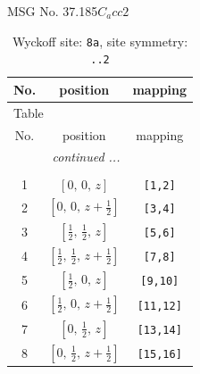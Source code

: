 \documentclass[fleqn,8pt]{jsarticle}
\begin{document}
\setcounter{MaxMatrixCols}{32}

\renewcommand{\tablename}{Table~}
\renewcommand{\figurename}{Figure~}
\begin{center}
\LARGE
MSG No. 37.185\quad$C_{a}cc2$
\end{center}
\renewcommand{\arraystretch}{1.2}
\begin{longtable}{ccc}
\caption{Wyckoff site: {\tt 8a}, site symmetry: {\tt ..2}}
 \\
 \hline \hline
No. & position & mapping \\ \hline \endfirsthead

\multicolumn{2}{l}{\tablename\ \thetable{}} \\
 \hline \hline
No. & position & mapping \\ \hline \endhead

 \hline \hline
\multicolumn{2}{r}{\footnotesize\it continued ...} \\ \endfoot

 \hline \hline
\multicolumn{2}{r}{} \\ \endlastfoot

1 & $\left[ 0,\, 0,\, z \right]$ & {\tt [1,2]} \\ \hline
2 & $\left[ 0,\, 0,\, z + \frac{1}{2} \right]$ & {\tt [3,4]} \\ \hline
3 & $\left[ \frac{1}{2},\, \frac{1}{2},\, z \right]$ & {\tt [5,6]} \\ \hline
4 & $\left[ \frac{1}{2},\, \frac{1}{2},\, z + \frac{1}{2} \right]$ & {\tt [7,8]} \\ \hline
5 & $\left[ \frac{1}{2},\, 0,\, z \right]$ & {\tt [9,10]} \\ \hline
6 & $\left[ \frac{1}{2},\, 0,\, z + \frac{1}{2} \right]$ & {\tt [11,12]} \\ \hline
7 & $\left[ 0,\, \frac{1}{2},\, z \right]$ & {\tt [13,14]} \\ \hline
8 & $\left[ 0,\, \frac{1}{2},\, z + \frac{1}{2} \right]$ & {\tt [15,16]} \\
\end{longtable}
\renewcommand{\arraystretch}{1.2}
\end{document}
